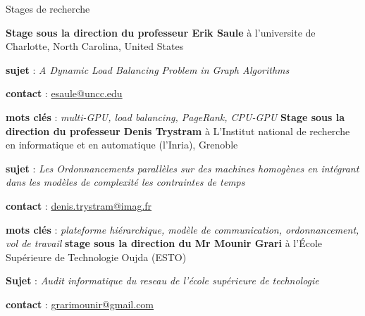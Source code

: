 \begin{rubric}{Stages de recherche}



	\textbf{Stage sous la direction du professeur Erik Saule} à l’universite de Charlotte, North Carolina, United States
	\par \textbf{sujet} : \emph{A Dynamic Load Balancing Problem in Graph Algorithms}
	\par \textbf{contact} : \href{mailto:esaule@uncc.edu}{esaule@uncc.edu}
	\par \textbf{mots clés} : \emph{multi-GPU, load balancing, PageRank, CPU-GPU}
%
%
	\textbf{Stage sous la direction du professeur Denis Trystram} à L'Institut national de recherche en informatique et en automatique (l'Inria), Grenoble
	\par	\textbf{sujet} : \emph{Les Ordonnancements parallèles sur des machines homogènes en intégrant dans les modèles de complexité les contraintes de temps}
	\par \textbf{contact} :  \href{mailto:denis.trystram@imag.fr}{denis.trystram@imag.fr}
	\par \textbf{mots clés} : \emph{plateforme hiérarchique, modèle de communication, ordonnancement, vol de travail}
%
%
	\textbf{stage sous la direction du Mr Mounir Grari} à l’École Supérieure de Technologie Oujda (ESTO)
	\par	\textbf{Sujet} : \emph{Audit informatique du reseau de l'école supérieure de technologie}
	\par \textbf{contact} :  \href{mailto:grarimounir@gmail.com}{grarimounir@gmail.com}
\end{rubric}
